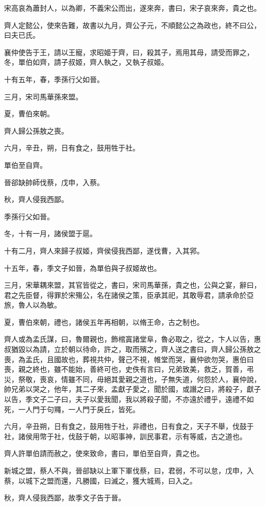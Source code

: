 \begin{pinyinscope}
宋高哀為蕭封人，以為卿，不義宋公而出，遂來奔，書曰，宋子哀來奔，貴之也。

齊人定懿公，使來告難，故書以九月，齊公子元，不順懿公之為政也，終不曰公，曰夫已氏。

襄仲使告于王，請以王寵，求昭姬于齊，曰，殺其子，焉用其母，請受而罪之，冬，單伯如齊，請子叔姬，齊人執之，又執子叔姬。

十有五年，春，季孫行父如晉。

三月，宋司馬華孫來盟。

夏，曹伯來朝。

齊人歸公孫敖之喪。

六月，辛丑，朔，日有食之，鼓用牲于社。

單伯至自齊。

晉郤缺帥師伐蔡，戊申，入蔡。

秋，齊人侵我西鄙。

季孫行父如晉。

冬，十有一月，諸侯盟于扈。

十有二月，齊人來歸子叔姬，齊侯侵我西鄙，遂伐曹，入其郛。

十五年，春，季文子如晉，為單伯與子叔姬故也。

三月，宋華耦來盟，其官皆從之，書曰，宋司馬華孫，貴之也，公與之宴，辭曰，君之先臣督，得罪於宋殤公，名在諸侯之策，臣承其祀，其敢辱君，請承命於亞旅，魯人以為敏。

夏，曹伯來朝，禮也，諸侯五年再相朝，以脩王命，古之制也。

齊人或為孟氏謀，曰，魯爾親也，飾棺寘諸堂阜，魯必取之，從之，卞人以告，惠叔猶毀以為請，立於朝以待命，許之，取而殯之，齊人送之書曰，齊人歸公孫敖之喪，為孟氏，且國故也，葬視共仲，聲己不視，帷堂而哭，襄仲欲勿哭，惠伯曰喪，親之終也，雖不能始，善終可也，史佚有言曰，兄弟致美，救乏，賀善，弔災，祭敬，喪哀，情雖不同，毋絕其愛親之道也，子無失道，何怨於人，襄仲說，帥兄弟以哭之，他年，其二子來，孟獻子愛之，聞於國，或譖之曰，將殺子，獻子以告，季文子二子曰，夫子以愛我聞，我以將殺子聞，不亦遠於禮乎，遠禮不如死，一人門于句鼆，一人門于戾丘，皆死。

六月，辛丑朔，日有食之，鼓用牲于社，非禮也，日有食之，天子不舉，伐鼓于社，諸侯用幣于社，伐鼓于朝，以昭事神，訓民事君，示有等威，古之道也。

齊人許單伯請而赦之，使來致命，書曰，單伯至自齊，貴之也。

新城之盟，蔡人不與，晉郤缺以上軍下軍伐蔡，曰，君弱，不可以怠，戊申，入蔡，以城下之盟而還，凡勝國，曰滅之，獲大城焉，曰入之。

秋，齊人侵我西鄙，故季文子告于晉。


\end{pinyinscope}
